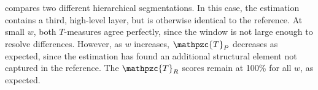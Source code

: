 \documentclass{article}
\def\shag{\ensuremath{\mathpzc{T}}}
\begin{document}

 compares two different hierarchical segmentations.
In this case, the estimation contains a third, high-level layer, but is otherwise identical to the reference.
At small $w$, both $T$-measures agree perfectly, since the window
is not large enough to resolve differences.
However, as $w$ increases, $\shag_P$ decreases as expected, since the
estimation has found an additional structural element not captured in the reference.
The $\shag_R$ scores remain at 100\% for all $w$, as expected.
\end{document}
